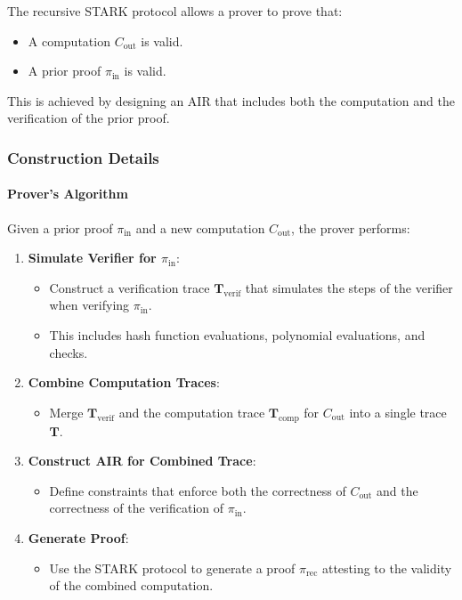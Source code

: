 \documentclass{article}
\theoremstyle{plain}
\theoremstyle{definition}
\theoremstyle{remark}
\theoremstyle{problem}
\begin{document}
The recursive STARK protocol allows a prover to prove that:

\begin{itemize}
    \item A computation $C_{\text{out}}$ is valid.
    \item A prior proof $\pi_{\text{in}}$ is valid.
\end{itemize}

This is achieved by designing an AIR that includes both the computation and the verification of the prior proof.

\subsubsection{Construction Details}

\paragraph{Prover's Algorithm}

Given a prior proof $\pi_{\text{in}}$ and a new computation $C_{\text{out}}$, the prover performs:

\begin{enumerate}
    \item \textbf{Simulate Verifier for $\pi_{\text{in}}$}:

    \begin{itemize}
        \item Construct a verification trace $\mathbf{T}_{\text{verif}}$ that simulates the steps of the verifier when verifying $\pi_{\text{in}}$.
        \item This includes hash function evaluations, polynomial evaluations, and checks.
    \end{itemize}

    \item \textbf{Combine Computation Traces}:

    \begin{itemize}
        \item Merge $\mathbf{T}_{\text{verif}}$ and the computation trace $\mathbf{T}_{\text{comp}}$ for $C_{\text{out}}$ into a single trace $\mathbf{T}$.
    \end{itemize}

    \item \textbf{Construct AIR for Combined Trace}:

    \begin{itemize}
        \item Define constraints that enforce both the correctness of $C_{\text{out}}$ and the correctness of the verification of $\pi_{\text{in}}$.
    \end{itemize}

    \item \textbf{Generate Proof}:

    \begin{itemize}
        \item Use the STARK protocol to generate a proof $\pi_{\text{rec}}$ attesting to the validity of the combined computation.
    \end{itemize}
\end{enumerate}
\end{document}

